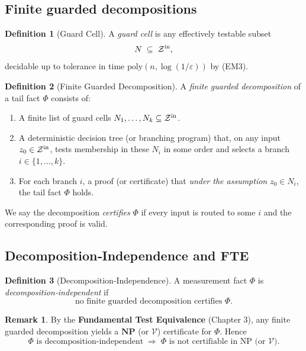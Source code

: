 \documentclass[12pt]{article}
\theoremstyle{definition}
\newtheorem{definition}{Definition}[section]
\newtheorem{remark}{Remark}[section]
\theoremstyle{plain}
\begin{document}
\subsection{Finite guarded decompositions}

\begin{definition}[Guard Cell]
A \emph{guard cell} is any effectively testable subset
\[
  N\;\subseteq\;\mathcal Z^{\rm in},
\]
decidable up to tolerance in time $\mathrm{poly}(n,\log(1/\varepsilon))$ by (EM3).  
\end{definition}

\begin{definition}[Finite Guarded Decomposition]
A \emph{finite guarded decomposition} of a tail fact $\Phi$ consists of:
\begin{enumerate}[itemsep=2pt]
  \item A finite list of guard cells $N_1,\dots,N_k\subseteq\mathcal Z^{\rm in}$.
  \item A deterministic decision tree (or branching program) that, on any input $z_0\in\mathcal Z^{\rm in}$, tests membership in these $N_i$ in some order and selects a branch $i\in\{1,\dots,k\}$.
  \item For each branch $i$, a proof (or certificate) that \emph{under the assumption} $z_0\in N_i$, the tail fact $\Phi$ holds.
\end{enumerate}
We say the decomposition \emph{certifies} $\Phi$ if every input is routed to some $i$ and the corresponding proof is valid.
\end{definition}


\subsection{Decomposition‑Independence and FTE}

\begin{definition}[Decomposition‑Independence]
A measurement fact $\Phi$ is \emph{decomposition‑independent} if
\[
  \textstyle
  \text{no finite guarded decomposition certifies }\Phi.
\]
\end{definition}

\begin{remark}
By the \textbf{Fundamental Test Equivalence} (Chapter 3), any finite guarded decomposition yields a \(\mathbf{NP}\) (or \(\mathcal V\)) certificate for $\Phi$.  Hence
\[
  \Phi\text{ is decomposition‑independent}
  \;\Longrightarrow\;
  \Phi\text{ is not certifiable in NP (or }\mathcal V\text{)}.
\]
\end{remark}
\end{document}
